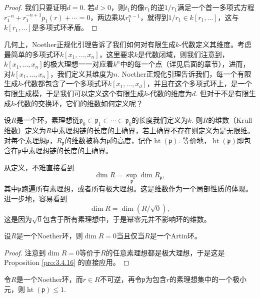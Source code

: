 \begin{proof}
我们只要证明$d=0$. 若$d>0$，则$t_1$的像$r_1$的逆$1/r_1$满足一个首一多项式方程$r_1^{-n}+r_1^{-n+1}p_1(r)+\cdots=0$，两边乘以$r_1^{n-1}$，就得到$1/r_1\in k[r_1,\dots]$，这与$k[r_1,\dots]$是多项式环矛盾。
\end{proof}

几何上，Noether正规化引理告诉了我们如何对有限生成$k$-代数定义其维度。考虑最简单的多项式环$k[x_1,\dots,x_n]$，这里要求$k$是代数闭域，则我们注意到，$k[x_1,\dots,x_n]$的极大理想一一对应着$k^n$中的每一个点（详见后面的章节），进而，对$k[x_1,\dots,x_n]$，我们定义其维度为$n$. Noether正规化引理告诉我们，每一个有限生成$k$-代数都包含了一个多项式环$k[x_1,\dots,x_d]$，并且在这个多项式环上，是一个有限生成模，于是我们可以定义这个有限生成$k$-代数的维度为$d$. 但对于不是有限生成$k$-代数的交换环，它们的维数如何定义呢？

\begin{para}[维数]
设$R$是一个环，素理想链$\mathfrak p_0\subset \mathfrak p_1\subset \cdots \subset \mathfrak p_k$的长度我们定义为$k$. 则$R$的维数（Krull维数）定义为$R$中素理想链的长度的上确界，若上确界不存在则定义为是无限维。对每个素理想$\mathfrak p$，$R_{\mathfrak p}$的维数被称为$\mathfrak p$的高度，记作$\operatorname{ht}(\mathfrak p)$. 等价地，$\operatorname{ht}(\mathfrak p)$即包含在$\mathfrak p$中素理想链的长度的上确界。
\end{para}

从定义，不难直接看到
\[
	\dim R=\sup_{\mathfrak p}\dim R_{\mathfrak p},
\]
其中$\mathfrak p$跑遍所有素理想，或者所有极大理想。这是维数作为一个局部性质的体现。进一步地，容易看到
\[
	\dim R=\dim (R/\sqrt{0}),
\]
这是因为$\sqrt{0}$包含于所有素理想中，于是幂零元并不影响环的维数。

\begin{pro}
设$R$是一个Noether环，则$\dim R=0$当且仅当$R$是一个Artin环。
\end{pro}

\begin{proof}
注意到$\dim R=0$等价于$R$的任意素理想都是极大理想，于是这是Proposition \ref{pro:3.4.16} 的直接应用。
\end{proof}

\begin{pro}
令$R$是一个Noether环，而$r\in R$不可逆，再令$\mathfrak p$为包含$r$的素理想集中的一个极小元，则$\operatorname{ht}(\mathfrak p)\leq 1$.
\end{pro}

